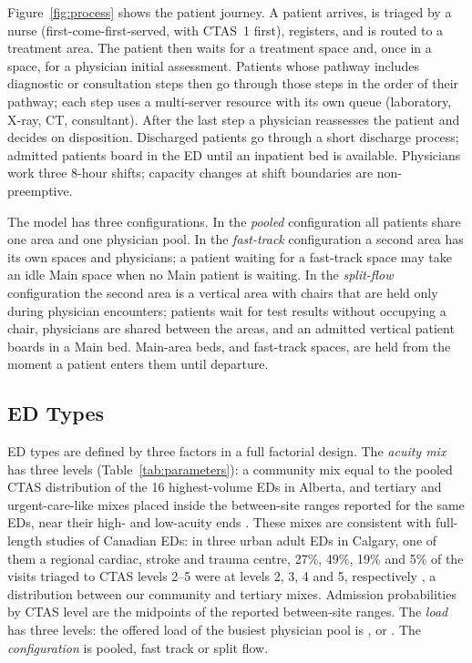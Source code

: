 Figure~\ref{fig:process} shows the patient journey. A patient arrives, is triaged by a nurse (first-come-first-served, with CTAS~1 first), registers, and is routed to a treatment area. The patient then waits for a treatment space and, once in a space, for a physician initial assessment. Patients whose pathway includes diagnostic or consultation steps then go through those steps in the order of their pathway; each step uses a multi-server resource with its own queue (laboratory, X-ray, CT, consultant). After the last step a physician reassesses the patient and decides on disposition. Discharged patients go through a short discharge process; admitted patients board in the ED until an inpatient bed is available. Physicians work three 8-hour shifts; capacity changes at shift boundaries are non-preemptive.

The model has three configurations. In the \emph{pooled} configuration all patients share one area and one physician pool. In the \emph{fast-track} configuration a second area has its own spaces and physicians; a patient waiting for a fast-track space may take an idle Main space when no Main patient is waiting. In the \emph{split-flow} configuration the second area is a vertical area with chairs that are held only during physician encounters; patients wait for test results without occupying a chair, physicians are shared between the areas, and an admitted vertical patient boards in a Main bed. Main-area beds, and fast-track spaces, are held from the moment a patient enters them until departure.

\subsection{ED Types}

ED types are defined by three factors in a full factorial design. The \emph{acuity mix} has three levels (Table~\ref{tab:parameters}): a community mix equal to the pooled CTAS distribution of the 16 highest-volume EDs in Alberta, and tertiary and urgent-care-like mixes placed inside the between-site ranges reported for the same EDs, near their high- and low-acuity ends \cite{Holroyd2016_EDCaseMix}. These mixes are consistent with full-length studies of Canadian EDs: in three urban adult EDs in Calgary, one of them a regional cardiac, stroke and trauma centre, 27\%, 49\%, 19\% and 5\% of the visits triaged to CTAS levels 2--5 were at levels 2, 3, 4 and 5, respectively \cite{McRae2022_CrowdingRevisits}, a distribution between our community and tertiary mixes. Admission probabilities by CTAS level are the midpoints of the reported between-site ranges. The \emph{load} has three levels: the offered load of the busiest physician pool is \LoadLow, \LoadMedium{} or \LoadHigh. The \emph{configuration} is pooled, fast track or split flow.

